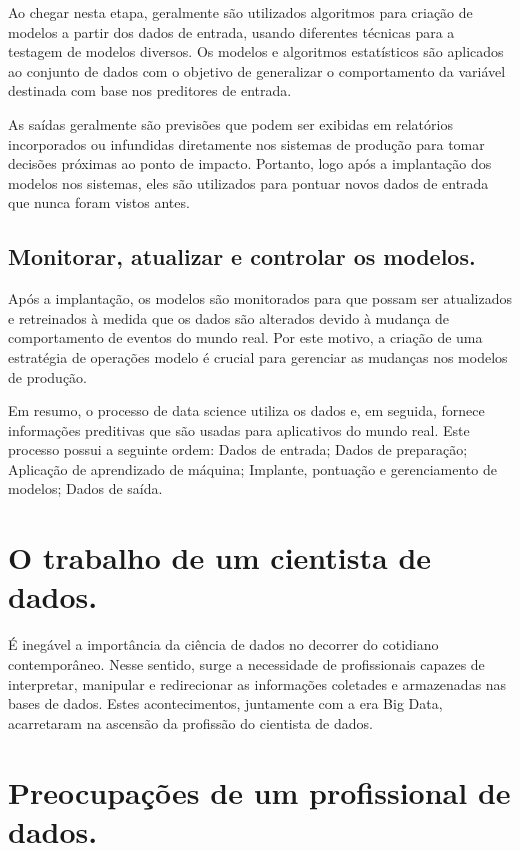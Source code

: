 \documentclass[12pt]{article}
\begin{document}
Ao chegar nesta etapa, geralmente são utilizados algoritmos para criação de modelos a partir dos dados de entrada, usando diferentes técnicas para a testagem de modelos diversos. Os modelos e algoritmos estatísticos são aplicados ao conjunto de dados com o objetivo de generalizar o comportamento da variável destinada com base nos preditores de entrada.

As saídas geralmente são previsões que podem ser exibidas em relatórios incorporados ou infundidas diretamente nos sistemas de produção para tomar decisões próximas ao ponto de impacto. Portanto, logo após a implantação dos modelos nos sistemas, eles são utilizados para pontuar novos dados de entrada que nunca foram vistos antes.

\subsection{Monitorar, atualizar e controlar os modelos.}

Após a implantação, os modelos são monitorados para que possam ser atualizados e retreinados à medida que os dados são alterados devido à mudança de comportamento de eventos do mundo real. Por este motivo, a criação de uma estratégia de operações modelo é crucial para gerenciar as mudanças nos modelos de produção.

Em resumo, o processo de data science utiliza os dados e, em seguida, fornece informações preditivas que são usadas para aplicativos do mundo real. Este processo possui a seguinte ordem: Dados de entrada; Dados de preparação; Aplicação de aprendizado de máquina; Implante, pontuação e gerenciamento de modelos; Dados de saída.

\section{O trabalho de um cientista de dados.}

É inegável a importância da ciência de dados no decorrer do cotidiano contemporâneo. Nesse sentido, surge a necessidade de profissionais capazes de interpretar, manipular e redirecionar as informações coletades e armazenadas nas bases de dados. Estes acontecimentos, juntamente com a era Big Data, acarretaram na ascensão da profissão do cientista de dados.

\section{Preocupações de um profissional de dados.}
\end{document}
